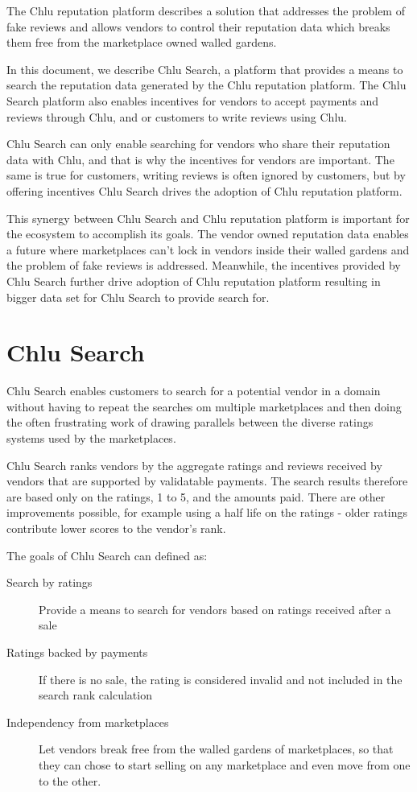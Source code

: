 \documentclass[a4paper]{article}
\begin{document}
The Chlu reputation platform\cite{chlu-reputation} describes a
solution that addresses the problem of fake reviews and allows vendors
to control their reputation data which breaks them free from the
marketplace owned walled gardens.

In this document, we describe Chlu Search, a platform that provides a
means to search the reputation data generated by the Chlu reputation
platform. The Chlu Search platform also enables incentives for vendors
to accept payments and reviews through Chlu, and or customers to write
reviews using Chlu.

Chlu Search can only enable searching for vendors who share their
reputation data with Chlu, and that is why the incentives for vendors
are important. The same is true for customers, writing reviews is
often ignored by customers, but by offering incentives Chlu Search
drives the adoption of Chlu reputation platform.

This synergy between Chlu Search and Chlu reputation platform is
important for the ecosystem to accomplish its goals. The vendor owned
reputation data enables a future where marketplaces can't lock in
vendors inside their walled gardens and the problem of fake reviews is
addressed. Meanwhile, the incentives provided by Chlu Search further
drive adoption of Chlu reputation platform resulting in bigger data
set for Chlu Search to provide search for.

\section{Chlu Search}

Chlu Search enables customers to search for a potential vendor in a
domain without having to repeat the searches om multiple marketplaces
and then doing the often frustrating work of drawing parallels between
the diverse ratings systems used by the marketplaces.

Chlu Search ranks vendors by the aggregate ratings and reviews
received by vendors that are supported by validatable payments. The
search results therefore are based only on the ratings, 1 to 5, and
the amounts paid. There are other improvements possible, for example
using a half life on the ratings - older ratings contribute lower
scores to the vendor's rank.

The goals of Chlu Search can defined as:

\begin{description}
\item[Search by ratings] Provide a means to search for vendors based
  on ratings received after a sale
\item[Ratings backed by payments] If there is no sale, the rating is
  considered invalid and not included in the search rank calculation
\item[Independency from marketplaces] Let vendors break free from the
  walled gardens of marketplaces, so that they can chose to start
  selling on any marketplace and even move from one to the other.
\end{description}
\end{document}
